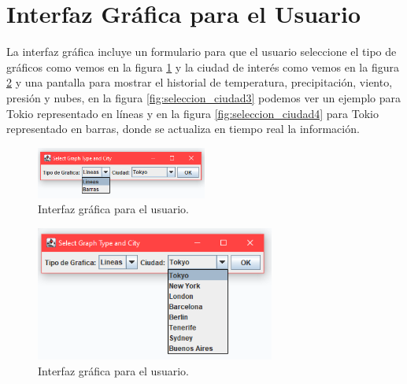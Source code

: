\documentclass{article}
\begin{document}
\section{Interfaz Gráfica para el Usuario}
La interfaz gráfica incluye un formulario para que el usuario seleccione el tipo de gráficos como vemos en la figura \ref{fig:seleccion_ciudad}  y la ciudad de interés como vemos en la figura \ref{fig:seleccion_ciudad2}  y una pantalla para mostrar el historial de temperatura, precipitación, viento, presión y nubes, en la figura \ref{fig:seleccion_ciudad3} podemos ver un ejemplo para Tokio representado en líneas y en la figura \ref{fig:seleccion_ciudad4} para Tokio representado en barras, donde se actualiza en tiempo real la información.

\begin{figure}[H]
    \centering
    \includegraphics[width=0.5\textwidth]{images/image5.png}
    \caption{Interfaz gráfica para el usuario.}
    \label{fig:seleccion_ciudad}
\end{figure}

\begin{figure}[H]
    \centering
    \includegraphics[width=0.7\textwidth]{images/image9.png}
    \caption{ Interfaz gráfica para el usuario.}
    \label{fig:seleccion_ciudad2}
\end{figure}
\end{document}
